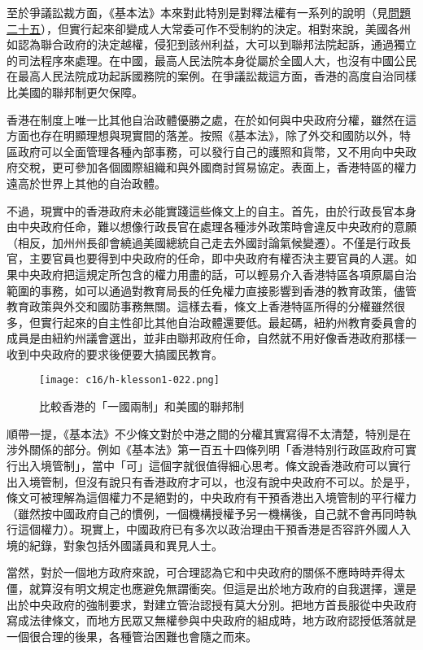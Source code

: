 至於爭議訟裁方面，《基本法》本來對此特別是對釋法權有一系列的說明（見\hyperref[sec:sec25]{問題二十五}），但實行起來卻變成人大常委可作不受制約的決定。相對來說，美國各州如認為聯合政府的決定越權，侵犯到該州利益，大可以到聯邦法院起訴，通過獨立的司法程序來處理。在中國，最高人民法院本身從屬於全國人大，也沒有中國公民在最高人民法院成功起訴國務院的案例。在爭議訟裁這方面，香港的高度自治同樣比美國的聯邦制更欠保障。

香港在制度上唯一比其他自治政體優勝之處，在於如何與中央政府分權，雖然在這方面也存在明顯理想與現實間的落差。按照《基本法》，除了外交和國防以外，特區政府可以全面管理各種內部事務，可以發行自己的護照和貨幣，又不用向中央政府交稅，更可參加各個國際組織和與外國商討貿易協定。表面上，香港特區的權力遠高於世界上其他的自治政體。

不過，現實中的香港政府未必能實踐這些條文上的自主。首先，由於行政長官本身由中央政府任命，難以想像行政長官在處理各種涉外政策時會違反中央政府的意願（相反，加州州長卻會繞過美國總統自己走去外國討論氣候變遷）。不僅是行政長官，主要官員也要得到中央政府的任命，即中央政府有權否決主要官員的人選。如果中央政府把這規定所包含的權力用盡的話，可以輕易介入香港特區各項原屬自治範圍的事務，如可以通過對教育局長的任免權力直接影響到香港的教育政策，儘管教育政策與外交和國防事務無關。這樣去看，條文上香港特區所得的分權雖然很多，但實行起來的自主性卻比其他自治政體還要低。最起碼，紐約州教育委員會的成員是由紐約州議會選出，並非由聯邦政府任命，自然就不用好像香港政府那樣一收到中央政府的要求後便要大搞國民教育。

\begin{figure}[htbp]
    \centering
    \texttt{[image: c16/h-klesson1-022.png]}
    \caption{比較香港的「一國兩制」和美國的聯邦制} 
\end{figure}

順帶一提，《基本法》不少條文對於中港之間的分權其實寫得不太清楚，特別是在涉外關係的部分。例如《基本法》第一百五十四條列明「香港特別行政區政府可實行出入境管制」，當中「可」這個字就很值得細心思考。條文說香港政府可以實行出入境管制，但沒有說只有香港政府才可以，也沒有說中央政府不可以。於是乎，條文可被理解為這個權力不是絕對的，中央政府有干預香港出入境管制的平行權力（雖然按中國政府自己的慣例，一個機構授權予另一機構後，自己就不會再同時執行這個權力）。現實上，中國政府已有多次以政治理由干預香港是否容許外國人入境的紀錄，對象包括外國議員和異見人士。

當然，對於一個地方政府來說，可合理認為它和中央政府的關係不應時時弄得太僵，就算沒有明文規定也應避免無謂衝突。但這是出於地方政府的自我選擇，還是出於中央政府的強制要求，對建立管治認授有莫大分別。把地方首長服從中央政府寫成法律條文，而地方民眾又無權參與中央政府的組成時，地方政府認授低落就是一個很合理的後果，各種管治困難也會隨之而來。

